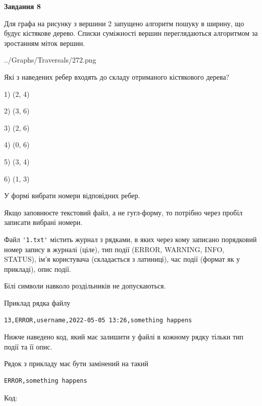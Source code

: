 \documentclass[12pt, ukrainian]{article}
\def\code#1{\Verb!#1!}
\begin{document}
{\begin {large}
{\begin {center}\textbf{Завдання 8}\end {center}}\par
Для графа на рисунку з вершини 2 запущено алгоритм пошуку в ширину, що будує кістякове дерево. Списки суміжності вершин переглядаються алгоритмом за зростанням міток вершин.\par
\begin{center}
	{../Graphs/Traversals/272.png}
\end{center}
\par Які з наведених ребер входять до складу отриманого кістякового дерева?\par
1) (2, 4)\par
2) (3, 6)\par
3) (2, 6)\par
4) (0, 6)\par
5) (3, 4)\par
6) (1, 3)\par
{\vskip 15pt} У формі вибрати номери відповідних ребер.


Якщо заповнюєте текстовий файл, а не гугл-форму, то потрібно через пробіл записа\-ти вибрані номери.\par
\newpage


Файл \code{'1.txt'} містить журнал з рядками, в яких через кому записано поряд\-ко\-вий номер запису в журналі (ціле), тип події (ERROR, WARNING, INFO, STATUS), ім'я користувача (складається з латиниці), час події (фор\-мат як у прикладі), опис події.

Білі символи навколо роздільників не допускаються.

Приклад рядка файлу



\begin{verbatim}
13,ERROR,username,2022-05-05 13:26,something happens
\end{verbatim}


Нижче наведено код, який має залишити у файлі в кожному рядку тільки тип події та її опис.

Рядок з прикладу має бути замінений на такий



\begin{verbatim}
ERROR,something happens
\end{verbatim}




Код:




\end{large}}
\end{document}
